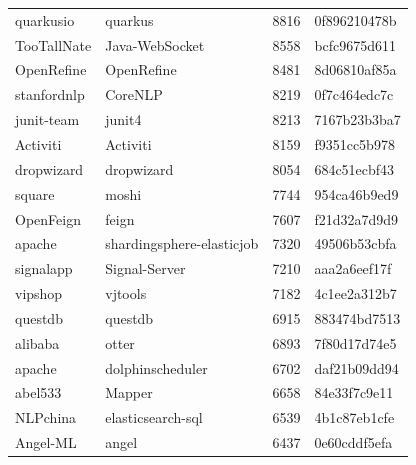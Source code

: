 \begin{longtable}{l | l | l | l}
    quarkusio           & quarkus                   & 8816  & 0f896210478b                            \\
    TooTallNate         & Java-WebSocket            & 8558  & bcfc9675d611                            \\
    OpenRefine          & OpenRefine                & 8481  & 8d06810af85a                            \\
    stanfordnlp         & CoreNLP                   & 8219  & 0f7c464edc7c                            \\
    junit-team          & junit4                    & 8213  & 7167b23b3ba7                            \\
    Activiti            & Activiti                  & 8159  & f9351cc5b978                            \\
    dropwizard          & dropwizard                & 8054  & 684c51ecbf43                            \\
    square              & moshi                     & 7744  & 954ca46b9ed9                            \\
    OpenFeign           & feign                     & 7607  & f21d32a7d9d9                            \\
    apache              & shardingsphere-elasticjob & 7320  & 49506b53cbfa                            \\
    signalapp           & Signal-Server             & 7210  & aaa2a6eef17f                            \\
    vipshop             & vjtools                   & 7182  & 4c1ee2a312b7                            \\
    questdb             & questdb                   & 6915  & 883474bd7513                            \\
    alibaba             & otter                     & 6893  & 7f80d17d74e5                            \\
    apache              & dolphinscheduler          & 6702  & daf21b09dd94                            \\
    abel533             & Mapper                    & 6658  & 84e33f7c9e11                            \\
    NLPchina            & elasticsearch-sql         & 6539  & 4b1c87eb1cfe                            \\
    Angel-ML            & angel                     & 6437  & 0e60cddf5efa                            \\

\end{longtable}
